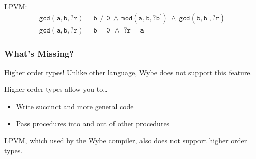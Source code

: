 \documentclass{beamer}
\begin{document}
\begin{frame}
  \vspace{2em}
  \begin{center}
    LPVM:
    \begin{equation*}
      \begin{array}{l}
        \mathtt{gcd(a, b, ?r) = b \neq 0\ \land\ mod(a, b, ?b^\prime)\ \land\ gcd(b, b^\prime, ?r)} \\
        \mathtt{gcd(a, b, ?r) = b = 0\,\ \land\,\ ?r = a}
      \end{array}
    \end{equation*}
  \end{center}     
\end{frame}


\begin{frame}
  \frametitle{What's Missing?}

  Higher order types! Unlike other language, Wybe does not support this feature.

  \vspace{2em}

  Higher order types allow you to\dots
  \begin{itemize}
    \item Write succinct and more general code
    \item Pass procedures into and out of other procedures
  \end{itemize}

  \vspace{2em}

  LPVM, which used by the Wybe compiler, also does not support higher order types.
\end{frame}



  
\end{document}
